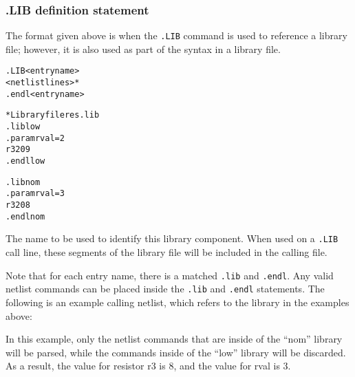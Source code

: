 \subsubsection{.LIB definition statement}
The format given above is when the \texttt{.LIB} command is used to reference
a library file; however, it is also used as part of the syntax in a library
file. 

\begin{Command}
\format
\begin{alltt}
.LIB <entry name>
<netlist lines>*
.endl <entry name>
\end{alltt}

\examples
\begin{alltt}

* Library file res.lib
.lib low
.param rval=2
r3  2  0  9
.endl low

.lib nom
.param rval=3
r3  2  0  8
.endl nom
\end{alltt}

\arguments
\begin{Arguments}
The name to be used to identify this library component.  When used on a \texttt{.LIB} call line, these segments of the library file will be included in the calling file.
\end{Arguments}
\end{Command}

Note that for each entry name, there is a matched \texttt{.lib}
and \texttt{.endl}.  Any valid netlist commands can be placed inside
the \texttt{.lib} and \texttt{.endl} statements.  The following is an
example calling netlist, which refers to the library in the examples above:

\begin{centering}
\end{centering}

In this example, only the netlist commands that are inside of the
``nom'' library will be parsed, while the commands inside of the
``low'' library will be discarded.  As a result, the value for
resistor r3 is 8, and the value for rval is 3.

